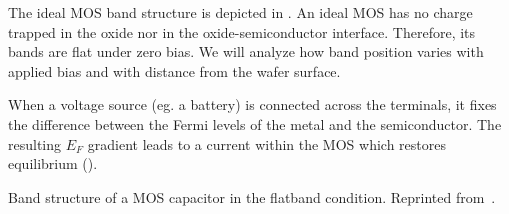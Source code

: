 The ideal MOS band structure is depicted in .
An ideal MOS has no charge trapped in the oxide nor in the oxide-semiconductor interface.
Therefore, its bands are flat under zero bias.
We will analyze how band position varies with applied bias and with distance from the wafer surface.

When a voltage source (eg. a battery) is connected across the terminals,
it fixes the difference between the Fermi levels of the metal and the semiconductor.
The resulting $E_F$ gradient leads to a current within the MOS which restores equilibrium
().

%
{Band structure of a MOS capacitor in the flatband condition.
Reprinted from~\cite{sze_physics_2007}.}

